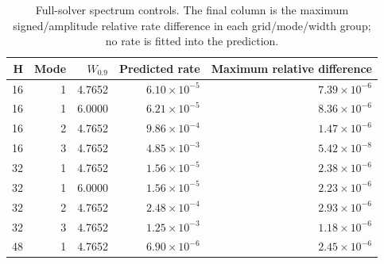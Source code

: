 \begin{table}[htbp]\centering\small
\caption{Full-solver spectrum controls. The final column is the maximum signed/amplitude relative rate difference in each grid/mode/width group; no rate is fitted into the prediction.}\label{tab:majorwaves}
\begin{tabular}{rrrrr}\toprule
H & Mode & $W_{0.9}$ & Predicted rate & Maximum relative difference\\\midrule
16 & 1 & 4.7652 & $6.10\times10^{-5}$ & $7.39\times10^{-6}$\\
16 & 1 & 6.0000 & $6.21\times10^{-5}$ & $8.36\times10^{-6}$\\
16 & 2 & 4.7652 & $9.86\times10^{-4}$ & $1.47\times10^{-6}$\\
16 & 3 & 4.7652 & $4.85\times10^{-3}$ & $5.42\times10^{-8}$\\
32 & 1 & 4.7652 & $1.56\times10^{-5}$ & $2.38\times10^{-6}$\\
32 & 1 & 6.0000 & $1.56\times10^{-5}$ & $2.23\times10^{-6}$\\
32 & 2 & 4.7652 & $2.48\times10^{-4}$ & $2.93\times10^{-6}$\\
32 & 3 & 4.7652 & $1.25\times10^{-3}$ & $1.18\times10^{-6}$\\
48 & 1 & 4.7652 & $6.90\times10^{-6}$ & $2.45\times10^{-6}$\\
\bottomrule\end{tabular}\end{table}
